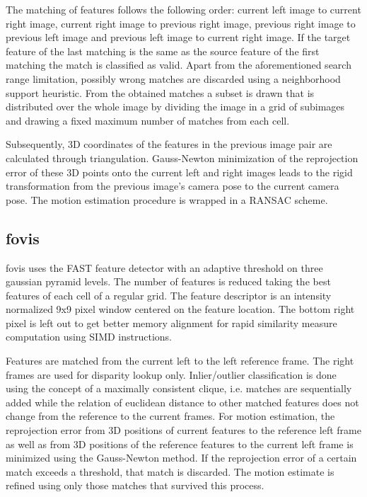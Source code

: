 \documentclass[conference]{IEEEtran}
\begin{document}
The matching of features follows the following order: current left image to current right image, current right image to previous right image, previous right image to previous left image and previous left image to current right image. If the target feature of the last matching is the same as the source feature of the first matching the match is classified as valid. Apart from the aforementioned search range limitation, possibly wrong matches are discarded using a neighborhood support heuristic.
From the obtained matches a subset is drawn that is distributed over the whole image by dividing the image in a grid of subimages and drawing a fixed maximum number of matches from each cell.

Subsequently, 3D coordinates of the features in the previous image pair are calculated through triangulation. Gauss-Newton minimization of the reprojection error of these 3D points onto the current left and right images leads to the rigid transformation from the previous image's camera pose to the current camera pose. The motion estimation procedure is wrapped in a RANSAC \cite{Fischler1981} scheme.


\subsection{fovis
  \label{fovis}
}

fovis uses the FAST feature detector \cite{Rosten2005FPA,Rosten2006MLF} with an adaptive threshold on three gaussian pyramid levels. The number of features is reduced taking the best features of each cell of a regular grid. The feature descriptor is an intensity normalized 9x9 pixel window centered on the feature location. The bottom right pixel is left out to get better memory alignment for rapid similarity measure computation using SIMD instructions.

Features are matched from the current left to the left reference frame. The right frames are used for disparity lookup only. Inlier/outlier classification is done using the concept of a maximally consistent clique, i.e. matches are sequentially added while the relation of euclidean distance to other matched features does not change from the reference to the current frames. For motion estimation, the reprojection error from 3D positions of current features to the reference left frame as well as from 3D positions of the reference features to the current left frame is minimized using the Gauss-Newton method. If the reprojection error of a certain match exceeds a threshold, that match is discarded. The motion estimate is refined using only those matches that survived this process.
\end{document}
